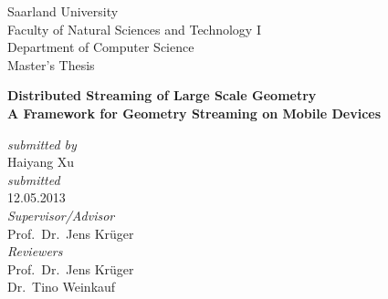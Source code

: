 \begin{titlepage} 

\begin{center}
    
Saarland University\\
Faculty of Natural Sciences and Technology I \\
Department of Computer Science \\[1.5cm]


{\Large Master's Thesis}\\[2.0cm]
 { 

{\LARGE \bfseries Distributed Streaming of Large Scale Geometry}\\[0.5cm]
{\Large \bfseries
 A Framework for Geometry Streaming on Mobile Devices} \\[1.5cm]
}
    
\begin{normalsize}
  \emph{submitted by}\\
  Haiyang Xu\\[1.2cm]
  
    \emph{submitted}\\
    12.05.2013\\[1.2cm]
    
  
  \emph{Supervisor/Advisor} \\
  Prof.~Dr.~Jens Kr\"uger\\[1.2cm]

  
  \emph{Reviewers} \\
  Prof.~Dr.~Jens Kr\"uger \\[0.1cm]
  Dr.~Tino Weinkauf \\[0.1cm]
\end{normalsize}

\end{center}


\end{titlepage}

%
%

